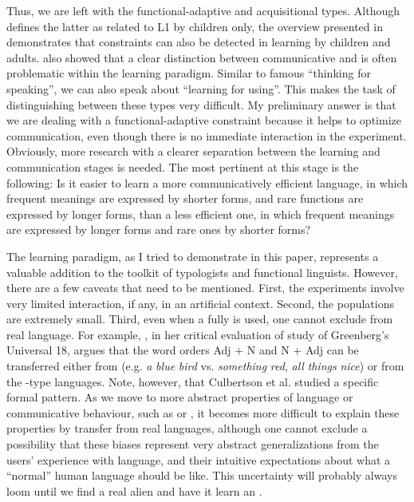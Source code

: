 \documentclass[output=paper]{langsci/langscibook}
\begin{document}
Thus, we are left with the functional-adaptive and acquisitional types. Although  defines the latter as related to L1 by children only, the overview presented in  demonstrates that  constraints can also be detected in  learning by children and adults.  also showed that a clear distinction between communicative  and  is often problematic within the  learning paradigm. Similar to  famous “thinking for speaking”, we can also speak about “learning for using”. This makes the task of distinguishing between these types very difficult. My preliminary answer is that we are dealing with a functional-adaptive constraint because it helps to optimize communication, even though there is no immediate interaction in the experiment. Obviously, more research with a clearer separation between the learning and communication stages is needed. The most pertinent  at this stage is the following: Is it easier to learn a more communicatively efficient language, in which frequent meanings are expressed by shorter forms, and rare functions are expressed by longer forms, than a less efficient one, in which frequent meanings are expressed by longer forms and rare ones by shorter forms?

The  learning paradigm, as I tried to demonstrate in this paper, represents a valuable addition to the toolkit of typologists and functional linguists. However, there are a few caveats that need to be mentioned. First, the experiments involve very limited interaction, if any, in an artificial context. Second, the populations are extremely small. Third, even when a fully  is used, one cannot exclude  from real language. For example, \citet{Goldberg2013}, in her critical evaluation of  study of Greenberg’s Universal 18, argues that the word orders Adj + N and N + Adj can be transferred either from  (e.g. \textit{a} \textit{blue} \textit{bird} vs. \textit{something} \textit{red}, \textit{all} \textit{things} \textit{nice}) or from the -type languages. Note, however, that Culbertson et al. studied a specific formal pattern. As we move to more abstract properties of language or communicative behaviour, such as  or , it becomes more difficult to explain these properties by transfer from real languages, although one cannot exclude a possibility that these biases represent very abstract generalizations from the users’ experience with language, and their intuitive expectations about what a “normal” human language should be like. This uncertainty will probably always loom until we find a real alien and have it learn an . 
\end{document}
